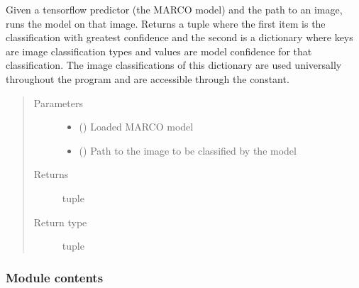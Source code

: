 \documentclass[letterpaper,10pt,english]{sphinxmanual}
\begin{document}
\begin{fulllineitems}
\label{\detokenize{polo.marco:polo.marco.run_marco.classify_image}}
Given a tensorflow predictor (the MARCO model) and the path to an image, 
runs the model on that image. Returns a tuple where the first item is the
classification with greatest confidence and the second is a dictionary where
keys are image classification types and values are model confidence for that
classification. The image classifications of this dictionary are used
universally throughout the program and are accessible through the
 constant.
\begin{quote}\begin{description}
\item[{Parameters}] \leavevmode\begin{itemize}
\item {} 
 () \textendash{} Loaded MARCO model

\item {} 
 () \textendash{} Path to the image to be classified by the model

\end{itemize}

\item[{Returns}] \leavevmode
tuple

\item[{Return type}] \leavevmode
tuple

\end{description}\end{quote}

\end{fulllineitems}



\subsubsection{Module contents}
\label{\detokenize{polo.marco:module-polo.marco}}\label{\detokenize{polo.marco:module-contents}}
\end{document}

